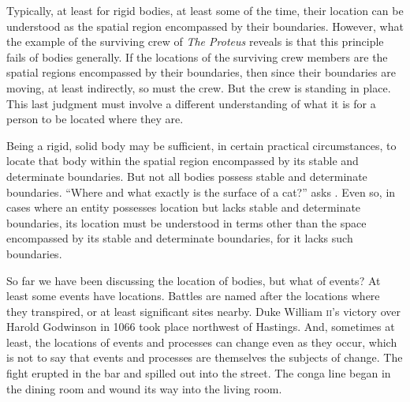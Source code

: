 Typically, at least for rigid bodies, at least some of the time, their location can be understood as the spatial region encompassed by their boundaries. However, what the example of the surviving crew of \emph{The Proteus} reveals is that this principle fails of bodies generally. If the locations of the surviving crew members are the spatial regions encompassed by their boundaries, then since their boundaries are moving, at least indirectly, so must the crew. But the crew is standing in place. This last judgment must involve a different understanding of what it is for a person to be located where they are.

Being a rigid, solid body may be sufficient, in certain practical circumstances, to locate that body within the spatial region encompassed by its stable and determinate boundaries. But not all bodies possess stable and determinate boundaries. ``Where and what exactly is the surface of a cat?'' asks \citet[lecture 9]{Austin:1962lr}. Even so, in cases where an entity possesses location but lacks stable and determinate boundaries, its location must be understood in terms other than the space encompassed by its stable and determinate boundaries, for it lacks such boundaries.

So far we have been discussing the location of bodies, but what of events? At least some events have locations. Battles are named after the locations where they transpired, or at least significant sites nearby. Duke William \textsc{ii}'s victory over Harold Godwinson in 1066 took place northwest of Hastings. And, sometimes at least, the locations of events and processes can change even as they occur, which is not to say that events and processes are themselves the subjects of change. The fight erupted in the bar and spilled out into the street. The conga line began in the dining room and wound its way into the living room.

